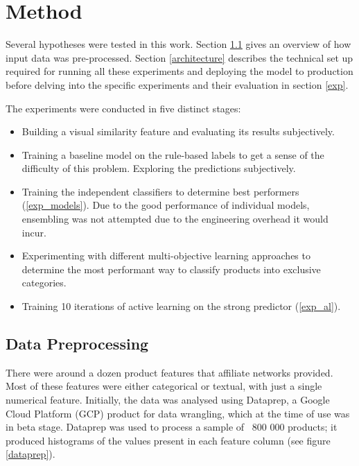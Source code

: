 \chapter{Method}
\label{meth}

Several hypotheses were tested in this work.
Section \ref{data_pp} gives an overview of how input data was pre-processed.
Section \ref{architecture} describes the technical set up required for running all these experiments and deploying the model to production before delving into the specific experiments and their evaluation in section \ref{exp}.

\hfill \break \noindent
The experiments were conducted in five distinct stages:

 \begin{itemize}
   \item Building a visual similarity feature and evaluating its results subjectively.
   \item
    Training a baseline model on the rule-based labels to get a sense of the difficulty of this problem.
    Exploring the predictions subjectively.
   \item
    Training the independent classifiers to determine best performers (\ref{exp_models}).
    Due to the good performance of individual models, ensembling was not attempted due to the engineering overhead it would incur.
   \item Experimenting with different multi-objective learning approaches to determine the most performant way to classify products into exclusive categories.
   \item Training 10 iterations of active learning on the strong predictor (\ref{exp_al}).
 \end{itemize}


 \section{Data Preprocessing}
 \label{data_pp}

There were around a dozen product features that affiliate networks provided.
Most of these features were either categorical or textual,  with just a single numerical feature.
Initially, the data was analysed using Dataprep, a Google Cloud Platform (GCP)  product for data wrangling, which at the time of use was in beta stage.
Dataprep  was used to process a sample of ~800 000 products;  it produced histograms of the values present in each feature column (see figure \ref{dataprep}).

